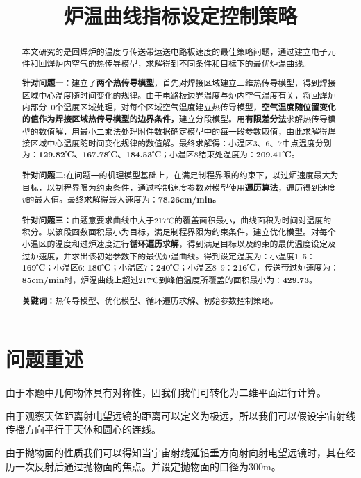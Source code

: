 \documentclass[withoutpreface,bwprint]{cumcmthesis} %
\title{炉温曲线指标设定控制策略}
\numberwithin{equation}{subsection}
\begin{document}
 \maketitle
 \begin{abstract}
本文研究的是回焊炉的温度与传送带运送电路板速度的最佳策略问题，通过建立电子元件和回焊炉内空气的热传导模型，求解得到不同条件和目标下的最优炉温曲线。

\textbf{针对问题一：}建立了\textbf{两个热传导模型}，首先对焊接区域建立三维热传导模型，得到焊接区域中心温度随时间变化的规律。由于电路板边界温度与炉内空气温度有关，将回焊炉内部分10个温度区域处理，对每个区域空气温度建立热传导模型，\textbf{空气温度随位置变化的值作为焊接区域热传导模型的边界条件，}建立分段模型。用\textbf{有限差分法}求解热传导模型的数值解，用最小二乘法处理附件数据确定模型中的每一段参数取值，由此求解得焊接区域中心温度随时间变化规律的数值解。最终求解得：小温区3、6、7中点温度分别为：\textbf{129.82℃、167.78℃、184.53℃}；小温区8结束处温度为：\textbf{209.41℃}。

\textbf{针对问题二:}在问题一的机理模型基础上，在满足制程界限的约束下，以过炉速度最大为目标，以制程界限为约束条件，通过控制速度参数对模型使用\textbf{遍历算法}，遍历得到速度$v$的最大值。最终求解得最大速度为：\textbf{78.26cm/min。}

\textbf{针对问题三：}由题意要求曲线中大于217℃的覆盖面积最小，曲线面积为时间对温度的积分。以该段函数面积最小为目标，满足制程界限为约束条件，建立优化模型。对每个小温区的温度和过炉速度进行\textbf{循环遍历求解}，得到满足目标以及约束的最优温度设定及过炉速度，并求出该初始参数下的最优炉温曲线。得到设定温度为：小温度1~5：\textbf{169℃}；小温区6: \textbf{180℃}；小温区7：\textbf{240℃}；小温区8~9：\textbf{216℃}，传送带过炉速度为：\textbf{85cm/min}时，炉温曲线上超过217℃到峰值温度所覆盖的面积最小为：\textbf{429.73}。


\textbf{关键词}：热传导模型、优化模型、循环遍历求解、初始参数控制策略。
\end{abstract}





\section{问题重述}

由于本题中几何物体具有对称性，固我们我们可转化为二维平面进行计算。

由于观察天体距离射电望远镜的距离可以定义为极远，所以我们可以假设宇宙射线传播方向平行于天体和圆心的连线。

由于抛物面的性质我们可以得知当宇宙射线延铅垂方向射向射电望远镜时，其在经历一次反射后通过抛物面的焦点。并设定抛物面的口径为300m。
\end{document}

